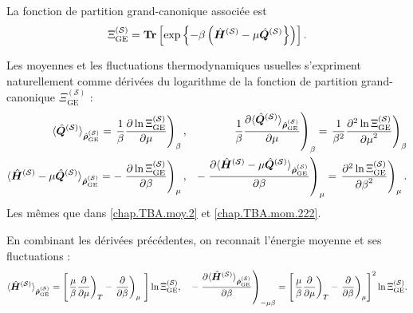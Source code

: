 \smallskip

La fonction de partition grand-canonique associée est
\begin{eqnarray}
	\Xi^{(\mathcal{S})}_{\mathrm{GE}} = \bm{\mathrm{Tr}}\left [ \exp \left \{ - \beta \left (\hat{\bm{H}}^{(\mathcal{S})} - \mu \hat{\bm{Q}}^{(\mathcal{S})} \right \} \right) \right ].  \label{chap.TBA.op.Z.S.GE}	
\end{eqnarray}

Les moyennes et les fluctuations thermodynamiques usuelles s’expriment naturellement comme dérivées du logarithme de la fonction de partition grand-canonique $\Xi^{(\mathcal{S})}_{\mathrm{GE}}$ :
\begin{eqnarray}
	\langle \hat{\bm{Q}}^{(\mathcal{S})} \rangle_{\hat{\bm{\rho}}^{(\mathcal{S})}_{\mathrm{GE}}}  = \left .\frac{1}{\beta} \frac{ \partial \ln \Xi^{(\mathcal{S})}_{\mathrm{GE}} }{\partial \mu } \right )_{\beta},  & &  \left . \frac{1}{\beta} \frac{ \partial \langle \hat{\bm{Q}}^{(\mathcal{S})} \rangle_{\hat{\bm{\rho}}^{(\mathcal{S})}_{\mathrm{GE}}}}{\partial \mu } \right )_{\beta} =  \left . \frac{1}{\beta^2} \frac{ \partial^2 \ln \Xi^{(\mathcal{S})}_{\mathrm{GE}} }{{\partial \mu}^2 } \right )_{\beta} \\
	\langle \hat{\bm{H}}^{(\mathcal{S})} - \mu\hat{\bm{Q}}^{(\mathcal{S})}  \rangle_{\hat{\bm{\rho}}^{(\mathcal{S})}_{\mathrm{GE}}}  = -\left . \frac{ \partial \ln \Xi^{(\mathcal{S})}_{\mathrm{GE}} }{\partial \beta } \right )_{\mu} ,  & & -\left .  \frac{ \partial \langle \hat{\bm{H}}^{(\mathcal{S})} - \mu\hat{\bm{Q}}^{(\mathcal{S})} \rangle_{\hat{\bm{\rho}}^{(\mathcal{S})}_{\mathrm{GE}}}}{\partial \beta } \right )_{\mu } = \left .  \frac{ \partial^2 \ln \Xi^{(\mathcal{S})}_{\mathrm{GE}} }{{\partial \beta}^2 } \right )_{\mu}   .		
\end{eqnarray}
Les mêmes que dans \eqref{chap.TBA.moy.2} et \eqref{chap.TBA.mom.222}. 

\smallskip

En combinant les dérivées précédentes, on reconnait l’énergie moyenne et ses fluctuations :
\begin{eqnarray}
	\langle \operator{H}^{(\mathcal{S})} \rangle_{\operator{\rho}^{(\mathcal{S})}_{\mathrm{GE}}}  = \left [ \left .\frac{\mu}{\beta} \frac{ \partial}{\partial \mu } \right )_{T} -\left . \frac{ \partial }{\partial \beta } \right )_{\mu}   \right ]\ln \Xi^{(\mathcal{S})}_{\mathrm{GE}} ,  \quad  -\left .  \frac{ \partial \langle \operator{H}^{(\mathcal{S})} \rangle_{\operator{\rho}^{(\mathcal{S})}_{\mathrm{GE}}}}{\partial \beta } \right )_{-\mu \beta } = \left [ \left .\frac{\mu}{\beta} \frac{ \partial}{\partial \mu } \right )_{T} -\left . \frac{ \partial }{\partial \beta } \right )_{\mu}  \right ]^2\ln \Xi^{(\mathcal{S})}_{\mathrm{GE}} .		
\end{eqnarray}

